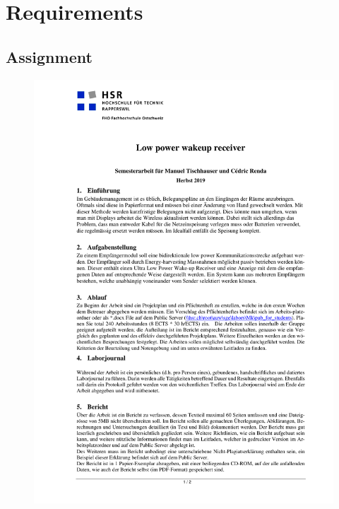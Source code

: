 \chapter{Requirements}

\newpage

\section{Assignment}
\begin{figure}[H]
	\centering
	\includegraphics[trim= 0cm 0cm 0cm 0cm,page=1,width=16cm]{../Aufgabenstellung/LowPowerWakeupReiceiver.pdf}
\end{figure}
